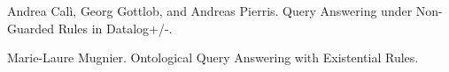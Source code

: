 
\begin{thebibliography}{1}

Andrea Calì, Georg Gottlob, and Andreas Pierris.
\newblock Query Answering under Non-Guarded Rules in Datalog+/-.

Marie-Laure Mugnier.
\newblock Ontological Query Answering with Existential Rules.


\end{thebibliography}


%

